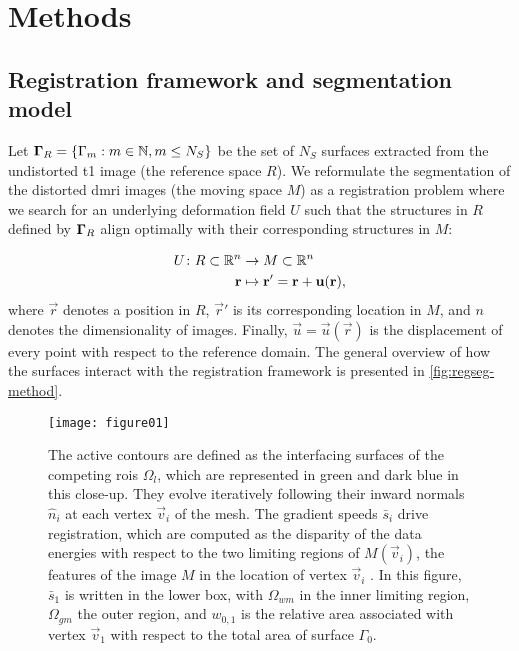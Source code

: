 \section{Methods}\label{sec:regseg-methods}

\subsection{Registration framework and segmentation model}\label{sec:regseg-methods_map}
Let $\boldsymbol{\Gamma}_R = \{\Gamma_m: m \in \mathbb{N}, m \leq N_S\}$ be the set of $N_S$ surfaces
  extracted from the undistorted \gls*{t1} image (the reference space $R$).
We reformulate the segmentation of the distorted \gls*{dmri} images (the moving space $M$)
  as a registration problem where we search for an underlying deformation field $U$ such that
  the structures in $R$ defined by $\boldsymbol{\Gamma}_R$ align optimally with their corresponding
  structures in $M$:

  \begin{align}
  U\colon R \subset \mathbb{R}^n &\to M \subset \mathbb{R}^n \notag\\
  \vec{r} &\mapsto \vec{r}' =\vec{r}+\vec{u}(\vec{r}),
  \label{eq:regseg-transform}
  \end{align}
  where $\vec{r}$ denotes a position in $R$, $\vec{r}'$ is
  its corresponding location in $M$, and $n$ denotes the dimensionality of images.
Finally, $\vec{u} = \vec{u}(\vec{r})$ is the displacement of every point with respect
  to the reference domain.
The general overview of how the surfaces interact with the registration framework
  is presented in \autoref{fig:regseg-method}.

\begin{figure}
  \texttt{[image: figure01]}
  \caption{The active contours are defined as the interfacing surfaces of the competing
    \glspl{roi} $\Omega_l$, which
  are represented in green and dark blue in this close-up.
  They evolve iteratively following their inward normals $\hat{n}_i$ at each vertex
    $\vec{v}_i$ of the mesh.
  The gradient speeds $\bar{s}_i$ drive registration, which are computed as the disparity of the data
    energies with respect to the two limiting regions of $M(\vec{v}_i)$, the features of the image
    $M$ in the location of vertex $\vec{v}_i$ .
  In this figure, $\bar{s}_1$ is written in the lower
    box, with $\Omega_{wm}$ in the inner limiting region, $\Omega_{gm}$ the outer region, and
    $w_{0,1}$ is the relative area associated with vertex $\vec{v}_1$ with respect to
    the total area of surface $\Gamma_0$.
      }\label{fig:regseg-method}
\end{figure}


